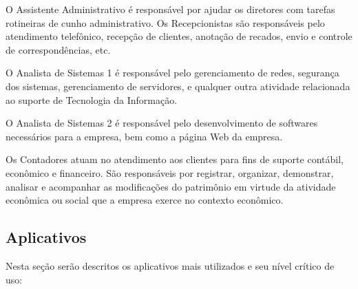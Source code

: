\documentclass[	DIV=calc,%
							paper=a4,%
							fontsize=12pt,%
							onecolumn]{scrartcl}	 					%
\begin{document}
O Assistente Administrativo é responsável por ajudar os diretores com tarefas rotineiras de cunho administrativo.
Os Recepcionistas são responsáveis pelo atendimento telefônico, recepção de clientes, anotação de recados, envio e controle de correspondências, etc.

O Analista de Sistemas 1 é responsável pelo gerenciamento de redes, segurança dos sistemas, gerenciamento de servidores, e qualquer outra atividade relacionada ao suporte de Tecnologia da Informação.

O Analista de Sistemas 2 é responsável pelo desenvolvimento de softwares necessários para a empresa, bem como a página Web da empresa.

Os Contadores atuam no atendimento aos clientes para fins de suporte contábil, econômico e financeiro. São responsáveis por registrar, organizar, demonstrar, analisar e acompanhar as modificações do patrimônio em virtude da atividade econômica ou social que a empresa exerce no contexto econômico.

\subsection{Aplicativos}

Nesta seção serão descritos os aplicativos mais utilizados e seu nível crítico de uso:
\end{document}
